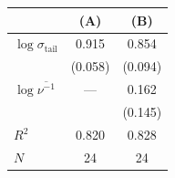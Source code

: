 \begin{tabular}{l cc}
\toprule
 & (A) & (B) \\
\midrule
$\log\sigma_{\mathrm{tail}}$ & 0.915 & 0.854 \\
 & (0.058) & (0.094) \\[3pt]
$\log\overline{\nu^{-1}}$ & --- & 0.162 \\
 & & (0.145) \\[3pt]
$R^2$ & 0.820 & 0.828 \\
$N$ & 24 & 24 \\
\bottomrule
\end{tabular}
